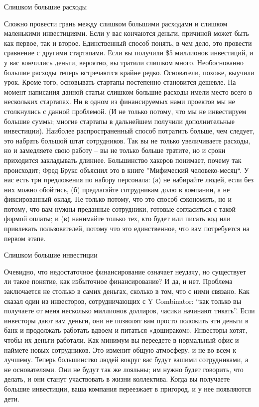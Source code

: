 \documentclass[ebook,12pt,oneside,openany]{memoir}
\begin{document}
Слишком большие расходы

Сложно провести грань между слишком большими расходами и слишком
маленькими инвестициями. Если у вас кончаются деньги, причиной может
быть как первое, так и второе. Единственный способ понять, в чем дело,
это провести сравнение с другими стартапами. Если вы получили \$5
миллионов инвестиций, и у вас кончились деньги, вероятно, вы тратили
слишком много. Необоснованно большие расходы теперь встречаются крайне
редко. Основатели, похоже, выучили урок. Кроме того, основывать
стартапы постепенно становится дешевле. На момент написания данной
статьи слишком большие расходы имели место всего в нескольких
стартапах. Ни в одном из финансируемых нами проектов мы не столкнулись
с данной проблемой. (И не только потому, что мы не инвестируем большие
суммы; многие стартапы в дальнейшем получили дополнительные
инвестиции). Наиболее распространенный способ потратить больше, чем
следует, это набрать большой штат сотрудников. Так вы не только
увеличиваете расходы, но и замедляете свою работу – вы не только
больше тратите, но и сроки приходится закладывать длиннее. Большинство
хакеров понимает, почему так происходит; Фред Брукс объяснил это в
книге ”Мифический человеко-месяц“. У нас есть три предложения по
набору персонала: (а) не набирайте людей, если без них можно обойтись,
(б) предлагайте сотрудникам долю в компании, а не фиксированный оклад.
Не только потому, что это способ сэкономить, но и потому, что вам
нужны преданные сотрудники, готовые согласиться с такой формой оплаты;
и (в) нанимайте только тех, кто будет или писать код или привлекать
пользователей, потому что это единственное, что вам потребуется на
первом этапе.

Слишком большие инвестиции

Очевидно, что недостаточное финансирование означает неудачу, но
существует ли такое понятие, как избыточное финансирование? И да, и
нет. Проблема заключается не столько в самих деньгах, сколько в том,
что с ними связано. Как сказал один из инвесторов, сотрудничающих с Y
Combinator: “как только вы получаете от меня несколько миллионов
долларов, часики начинают тикать”. Если инвесторы дают вам деньги, они
не позволят вам просто положить эти деньги в банк и продолжать
работать вдвоем и питаться «дошираком». Инвесторы хотят, чтобы их
деньги работали. Как минимум вы переедете в нормальный офис и наймете
новых сотрудников. Это изменит общую атмосферу, и не во всем к
лучшему. Теперь большинство людей вокруг вас будут вашими
сотрудниками, а не основателями. Они не будут так же лояльны; им нужно
будет говорить, что делать, и они станут участвовать в жизни
коллектива. Когда вы получаете большие инвестиции, ваша компания
переезжает в пригород, и у нее появляются дети.
\end{document}
